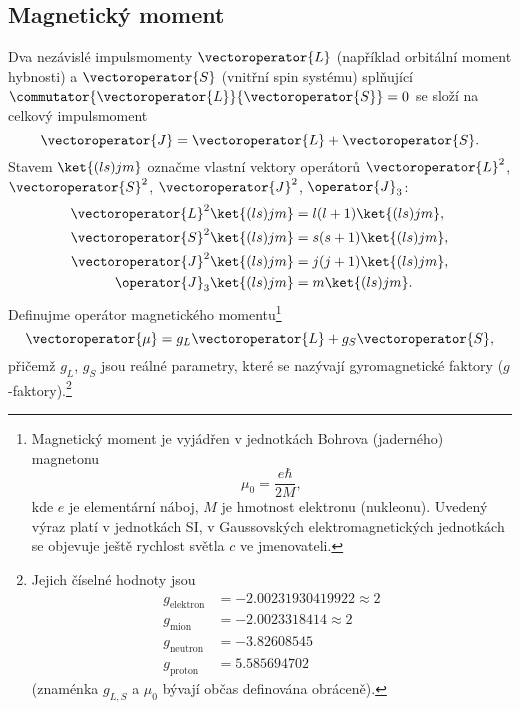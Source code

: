 \subsection{Magnetický moment}
	Dva nezávislé impulsmomenty $\vectoroperator{L}$ (například orbitální moment hybnosti) a $\vectoroperator{S}$ (vnitřní spin systému) splňující $\commutator{\vectoroperator{L}}{\vectoroperator{S}}=0$ se složí na celkový impulsmoment
	\begin{equation}
		\vectoroperator{J}=\vectoroperator{L}+\vectoroperator{S}.
	\end{equation}
	Stavem $\ket{(ls)jm}$ označme vlastní vektory operátorů $\vectoroperator{L}^{2}$, $\vectoroperator{S}^{2}$, $\vectoroperator{J}^{2}$, $\operator{J}_{3}$:
    \begin{subequations}
        \begin{align}
            \vectoroperator{L}^{2}\ket{(ls)jm}&=l(l+1)\ket{(ls)jm},\\
            \vectoroperator{S}^{2}\ket{(ls)jm}&=s(s+1)\ket{(ls)jm},\\
            \vectoroperator{J}^{2}\ket{(ls)jm}&=j(j+1)\ket{(ls)jm},\\
            \operator{J}_{3}\ket{(ls)jm}&=m\ket{(ls)jm}.
        \end{align}            
        \label{eq:LSEigenvalues}
    \end{subequations}
	Definujme operátor magnetického momentu\footnote{
		Magnetický moment je vyjádřen v jednotkách Bohrova (jaderného) magnetonu
		\begin{equation}
			\mu_{0}=\frac{e\hbar}{2M},
		\end{equation}
		kde $e$ je elementární náboj, $M$ je hmotnost elektronu (nukleonu).
		Uvedený výraz platí v jednotkách SI, v Gaussovských elektromagnetických jednotkách se objevuje ještě rychlost světla $c$ ve jmenovateli.
	}
	\begin{equation}
		\vectoroperator{\mu}=g_{L}\vectoroperator{L}+g_{S}\vectoroperator{S},
	\end{equation}
	přičemž $g_{L}$, $g_{S}$ jsou reálné parametry, které se nazývají gyromagnetické faktory ($g$-faktory).\footnote{
		Jejich číselné hodnoty jsou
		\begin{align}
			g_{\mathrm{elektron}}&=-2.00231930419922\approx2 \\
			g_{\mathrm{mion}}&=-2.0023318414\approx2 \\
			g_{\mathrm{neutron}}&=-3.82608545\\
			g_{\mathrm{proton}}&=5.585694702
		\end{align}
		(znaménka $g_{L,S}$ a $\mu_{0}$ bývají občas definována obráceně).
	}

